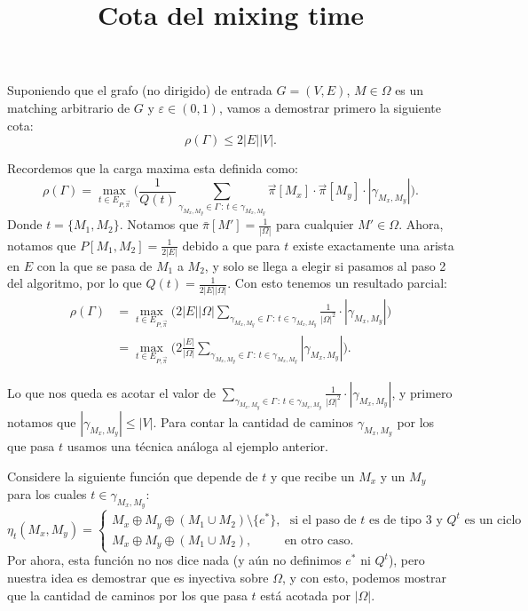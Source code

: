 \documentclass{article}
\title{Cota del mixing time}
\date{}
\newcommand{\eps}{\varepsilon}
\begin{document}
	\maketitle
	
	Suponiendo que el grafo (no dirigido) de entrada $G = (V,E)$, $M \in \Omega$ es un matching arbitrario de $G$ y $\eps\in(0,1)$, vamos a demostrar primero la siguiente cota:
	$$
	\rho(\Gamma) \leq 2|E||V|.
	$$
	
	Recordemos que la carga maxima esta definida como:
	$$
	\rho(\Gamma) = \max_{t \in E_{P,\vec \pi}} \bigg(\frac{1}{Q(t)} \sum_{\gamma_{M_x,M_y} \in \Gamma \,:\, t \in \gamma_{M_x,M_y}} \vec \pi[M_x] \cdot \vec \pi[M_y] \cdot |\gamma_{M_x,M_y}|\bigg).
	$$
	Donde $t = \{M_1, M_2\}$. Notamos que $\bar{\pi}[M'] = \frac{1}{|\Omega|}$ para cualquier $M'\in\Omega$. Ahora, notamos que $P[M_1,M_2] = \frac{1}{2|E|}$ debido a que para $t$ existe exactamente una arista en $E$ con la que se pasa de $M_1$ a $M_2$, y solo se llega a elegir si pasamos al paso 2 del algoritmo, por lo que $Q(t) = \frac{1}{2|E||\Omega|}$. Con esto tenemos un resultado parcial:
	\begin{align*}
	\rho(\Gamma) &= \max_{t \in E_{P,\vec \pi}} \bigg(2|E||\Omega| \sum_{\gamma_{M_x,M_y} \in \Gamma \,:\, t \in \gamma_{M_x,M_y}} \frac{1}{|\Omega|^2} \cdot |\gamma_{M_x,M_y}|\bigg)\\
	&= \max_{t \in E_{P,\vec \pi}} \bigg(2\frac{|E|}{|\Omega|} \sum_{\gamma_{M_x,M_y} \in \Gamma \,:\, t \in \gamma_{M_x,M_y}} |\gamma_{M_x,M_y}|\bigg).
	\end{align*}

	Lo que nos queda es acotar el valor de $\sum_{\gamma_{M_x,M_y} \in \Gamma \,:\, t \in \gamma_{M_x,M_y}} \frac{1}{|\Omega|^2} \cdot |\gamma_{M_x,M_y}|$, y primero notamos que $|\gamma_{M_x,M_y}| \leq |V|$. Para contar la cantidad de caminos $\gamma_{M_x, M_y}$ por los que pasa $t$ usamos una técnica análoga al ejemplo anterior.
	
	Considere la siguiente función que depende de $t$ y que recibe un $M_x$ y un $M_y$ para los cuales $t\in\gamma_{M_x, M_y}$:
	$$
	\eta_t(M_x, M_y) = \begin{cases}
		M_x \oplus M_y \oplus (M_1 \cup M_2) \setminus \{e^*\}, \ \ \ \text{si el paso de $t$ es de tipo 3 y $Q^t$ es un ciclo}\\
		M_x \oplus M_y \oplus (M_1 \cup M_2) , \ \ \ \ \ \ \ \ \ \ \, \ \text{en otro caso.}
		\end{cases}
	$$
	Por ahora, esta función no nos dice nada (y aún no definimos $e^*$ ni $Q^t$), pero nuestra idea es demostrar que es inyectiva sobre $\Omega$, y con esto, podemos mostrar que la cantidad de caminos por los que pasa $t$ está acotada por $|\Omega|$.
	
\end{document}
